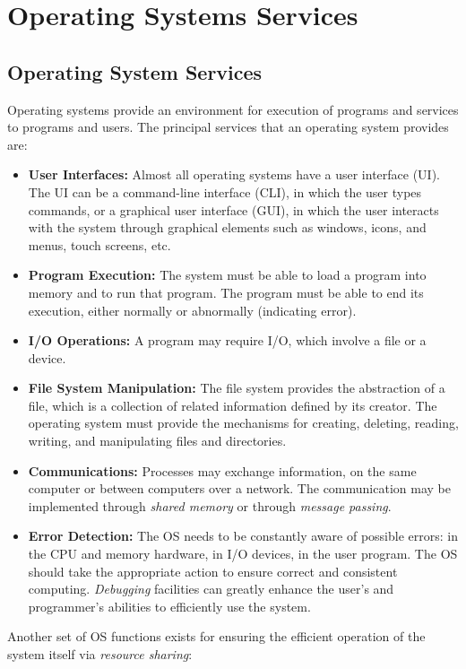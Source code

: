 \chapter{Operating Systems Services}

\section{Operating System Services}

    Operating systems provide an environment for execution of programs and services to programs and users. The principal services that an operating system provides are:
    \begin{itemize}
        \item \textbf{User Interfaces:} Almost all operating systems have a user interface (UI). The UI can be a command-line interface (CLI), in which the user types commands, or a graphical user interface (GUI), in which the user interacts with the system through graphical elements such as windows, icons, and menus, touch screens, etc.
        \item \textbf{Program Execution:} The system must be able to load a program into memory and to run that program. The program must be able to end its execution, either normally or abnormally (indicating error).
        \item \textbf{I/O Operations:} A program may require I/O, which involve a file or a device.
        \item \textbf{File System Manipulation:} The file system provides the abstraction of a file, which is a collection of related information defined by its creator. The operating system must provide the mechanisms for creating, deleting, reading, writing, and manipulating files and directories.
        \item \textbf{Communications:} Processes may exchange information, on the same computer or between computers over a network. The communication may be implemented through \emph{shared memory} or through \emph{message passing}.
        \item \textbf{Error Detection:} The OS needs to be constantly aware of possible errors: in the CPU and memory hardware, in I/O devices, in the user program. The OS should take the appropriate action to ensure correct and consistent computing. \emph{Debugging} facilities can greatly enhance the user's and programmer's abilities to efficiently use the system.
    \end{itemize}
    Another set of OS functions exists for ensuring the efficient operation of the system itself via \emph{resource sharing}:
